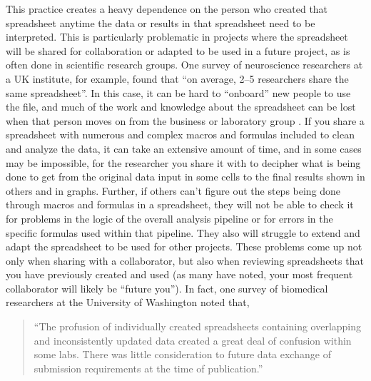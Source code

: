 \documentclass[]{tufte-book}
\begin{document}
This practice creates a heavy dependence on the person who created that
spreadsheet anytime the data or results in that spreadsheet need to be
interpreted. This is particularly problematic in projects where the spreadsheet
will be shared for collaboration or adapted to be used in a future project, as
is often done in scientific research groups. One survey of neuroscience
researchers at a UK institute, for example, found that ``on average, 2--5
researchers share the same spreadsheet''. \citep{altarawneh2017pilot} In this case, it
can be hard to ``onboard'' new people to use the file, and much of the work and
knowledge about the spreadsheet can be lost when that person moves on from the
business or laboratory group \citep{creeth1985microcomputer, myneni2010organization}. If you share a spreadsheet with numerous and complex
macros and formulas included to clean and analyze the data, it can take an
extensive amount of time, and in some cases may be impossible, for the
researcher you share it with to decipher what is being done to get from the
original data input in some cells to the final results shown in others and in
graphs. Further, if others can't figure out the steps being done through macros
and formulas in a spreadsheet, they will not be able to check it for problems in
the logic of the overall analysis pipeline or for errors in the specific
formulas used within that pipeline. They also will struggle to extend and adapt
the spreadsheet to be used for other projects. These problems come up not only
when sharing with a collaborator, but also when reviewing spreadsheets that you
have previously created and used (as many have noted, your most frequent
collaborator will likely be ``future you''). In fact, one survey of biomedical
researchers at the University of Washington noted that,

\begin{quote}
``The profusion of individually created spreadsheets containing overlapping and
inconsistently updated data created a great deal of confusion within some labs.
There was little consideration to future data exchange of submission
requirements at the time of publication.'' \citep{anderson2007issues}
\end{quote}
\end{document}
